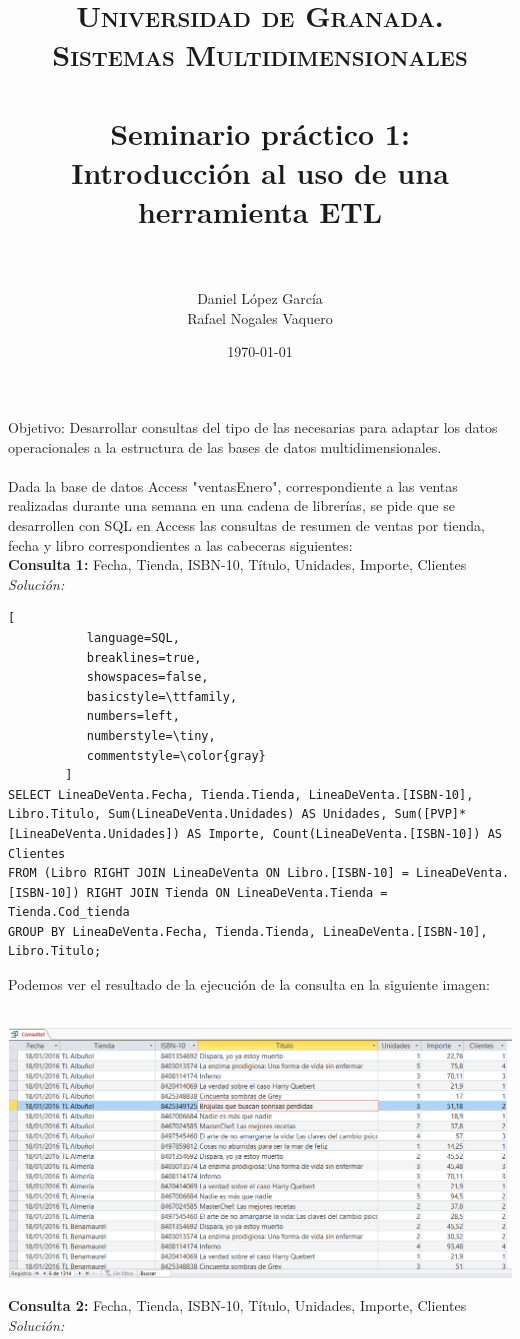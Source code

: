 \documentclass[paper=a4, fontsize=11pt, spanish]{scrartcl}
\title{
  \normalfont \normalsize 
  \textsc{Universidad de Granada.\\Sistemas Multidimensionales} \\ [25pt] %
  \horrule{0.5pt} \\[0.4cm] %
  \huge Seminario práctico 1: \\Introducción al uso de una herramienta ETL \\ %
  \horrule{2pt} \\[0.5cm] %
}
\author{Daniel López García\\Rafael Nogales Vaquero} %
\date{\normalsize\today} %
\numberwithin{equation}{section} %
\numberwithin{figure}{section} %
\numberwithin{table}{section} %
\begin{document}
\maketitle %
Objetivo: Desarrollar consultas del tipo de las necesarias para adaptar los datos operacionales a la estructura de las bases de datos multidimensionales.\\
\\
Dada la base de datos Access "ventasEnero", correspondiente a las ventas realizadas durante una semana en una cadena de librerías, se pide que se desarrollen con SQL en Access las consultas de resumen de ventas por tienda, fecha y libro correspondientes a las cabeceras siguientes:
\\
\textbf{Consulta 1:} Fecha, Tienda, ISBN-10, Título, Unidades, Importe, Clientes\\
\textit{Solución:}
\begin{lstlisting}[
           language=SQL,
           breaklines=true,
           showspaces=false,
           basicstyle=\ttfamily,
           numbers=left,
           numberstyle=\tiny,
           commentstyle=\color{gray}
        ]
SELECT LineaDeVenta.Fecha, Tienda.Tienda, LineaDeVenta.[ISBN-10], Libro.Titulo, Sum(LineaDeVenta.Unidades) AS Unidades, Sum([PVP]*[LineaDeVenta.Unidades]) AS Importe, Count(LineaDeVenta.[ISBN-10]) AS Clientes
FROM (Libro RIGHT JOIN LineaDeVenta ON Libro.[ISBN-10] = LineaDeVenta.[ISBN-10]) RIGHT JOIN Tienda ON LineaDeVenta.Tienda = Tienda.Cod_tienda
GROUP BY LineaDeVenta.Fecha, Tienda.Tienda, LineaDeVenta.[ISBN-10], Libro.Titulo;
\end{lstlisting}

Podemos ver el resultado de la ejecución de la consulta en la siguiente imagen:\\
\\
\begin{center}
	\includegraphics[scale=0.35]{1-zoom.png}
\end{center}
\textbf{Consulta 2:} Fecha, Tienda, ISBN-10, Título, Unidades, Importe, Clientes\\
\textit{Solución:}
\end{document}
